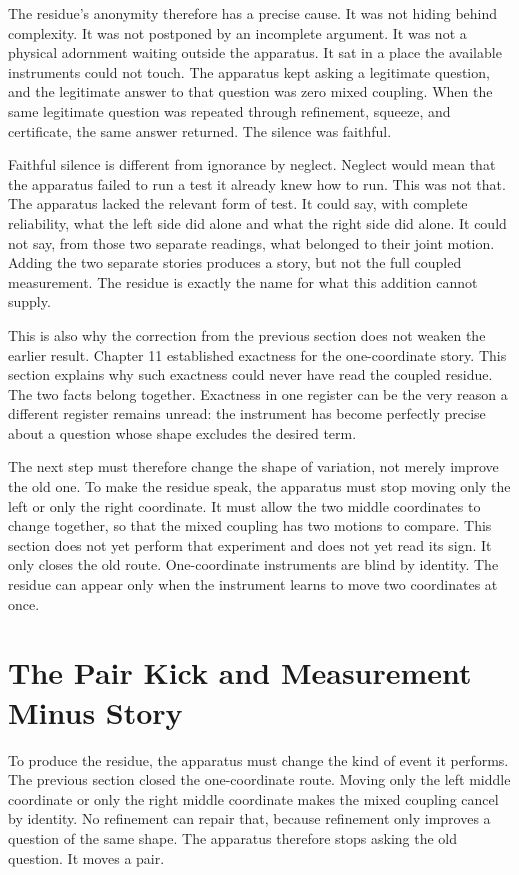 The residue's anonymity therefore has a precise cause. It was not hiding
behind complexity. It was not postponed by an incomplete argument. It was not a
physical adornment waiting outside the apparatus. It sat in a place the
available instruments could not touch. The apparatus kept asking a legitimate
question, and the legitimate answer to that question was zero mixed coupling.
When the same legitimate question was repeated through refinement, squeeze, and
certificate, the same answer returned. The silence was faithful.

Faithful silence is different from ignorance by neglect. Neglect would mean
that the apparatus failed to run a test it already knew how to run. This was
not that. The apparatus lacked the relevant form of test. It could say, with
complete reliability, what the left side did alone and what the right side did
alone. It could not say, from those two separate readings, what belonged to
their joint motion. Adding the two separate stories produces a story, but not
the full coupled measurement. The residue is exactly the name for what this
addition cannot supply.

This is also why the correction from the previous section does not weaken the
earlier result. Chapter 11 established exactness for the one-coordinate story. This
section explains why such exactness could never have read the coupled
residue. The two facts belong together. Exactness in one register can be the
very reason a different register remains unread: the instrument has become
perfectly precise about a question whose shape excludes the desired term.

The next step must therefore change the shape of variation, not merely improve
the old one. To make the residue speak, the apparatus must stop moving only the
left or only the right coordinate. It must allow the two middle coordinates to
change together, so that the mixed coupling has two motions to compare. This
section does not yet perform that experiment and does not yet read its sign. It
only closes the old route. One-coordinate instruments are blind by identity.
The residue can appear only when the instrument learns to move two coordinates
at once.

\section{The Pair Kick and Measurement Minus Story}

To produce the residue, the apparatus must change the kind of event it performs.
The previous section closed the one-coordinate route. Moving only the left
middle coordinate or only the right middle coordinate makes the mixed coupling
cancel by identity. No refinement can repair that, because refinement only
improves a question of the same shape. The apparatus therefore stops asking the
old question. It moves a pair.

